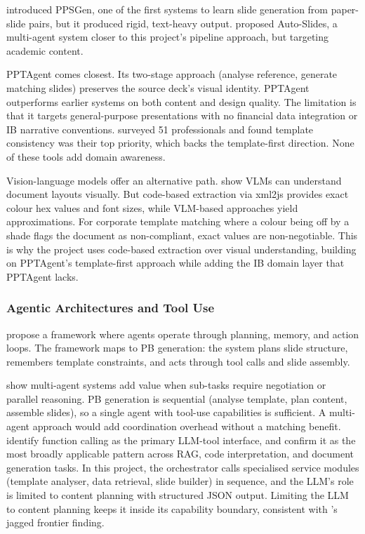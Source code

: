 \textcite{hu2013} introduced PPSGen, one of the first systems to learn slide generation from paper-slide pairs, but it produced rigid, text-heavy output. \textcite{yang2025} proposed Auto-Slides, a multi-agent system closer to this project's pipeline approach, but targeting academic content.

PPTAgent \parencite{zheng2025} comes closest. Its two-stage approach (analyse reference, generate matching slides) preserves the source deck's visual identity. PPTAgent outperforms earlier systems on both content and design quality. The limitation is that it targets general-purpose presentations with no financial data integration or IB narrative conventions. \textcite{liu2024} surveyed 51 professionals and found template consistency was their top priority, which backs the template-first direction. None of these tools add domain awareness.

Vision-language models offer an alternative path. \textcite{faysse2024} show VLMs can understand document layouts visually. But code-based extraction via xml2js provides exact colour hex values and font sizes, while VLM-based approaches yield approximations. For corporate template matching where a colour being off by a shade flags the document as non-compliant, exact values are non-negotiable. This is why the project uses code-based extraction over visual understanding, building on PPTAgent's template-first approach while adding the IB domain layer that PPTAgent lacks.

\subsubsection{Agentic Architectures and Tool Use}

\textcite{wang2024} propose a framework where agents operate through planning, memory, and action loops. The framework maps to PB generation: the system plans slide structure, remembers template constraints, and acts through tool calls and slide assembly.

\textcite{guo2024} show multi-agent systems add value when sub-tasks require negotiation or parallel reasoning. PB generation is sequential (analyse template, plan content, assemble slides), so a single agent with tool-use capabilities is sufficient. A multi-agent approach would add coordination overhead without a matching benefit. \textcite{qu2025} identify function calling as the primary LLM-tool interface, and \textcite{li2025paradigms} confirm it as the most broadly applicable pattern across RAG, code interpretation, and document generation tasks. In this project, the orchestrator calls specialised service modules (template analyser, data retrieval, slide builder) in sequence, and the LLM's role is limited to content planning with structured JSON output. Limiting the LLM to content planning keeps it inside its capability boundary, consistent with \textcite{dellacqua2023}'s jagged frontier finding.

